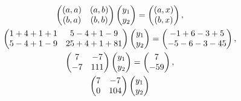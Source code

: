 \documentclass[12pt]{article}
\begin{document}
    \begin{gather*}
        \begin{pmatrix}
            \left ( a, a \right ) & \left ( a, b \right ) \\
            \left ( b, a \right ) & \left ( b, b \right )
        \end{pmatrix}
        \begin{pmatrix}
            y_1 \\
            y_2
        \end{pmatrix}
        =
        \begin{pmatrix}
            \left ( a, x \right ) \\
            \left ( b, x \right )
        \end{pmatrix}, \\
        \begin{pmatrix}
            1 + 4 + 1 + 1 & 5 - 4 + 1 - 9   \\
            5 - 4 + 1 - 9 & 25 + 4 + 1 + 81
        \end{pmatrix}
        \begin{pmatrix}
            y_1 \\
            y_2
        \end{pmatrix}
        =
        \begin{pmatrix}
            -1 + 6 - 3 + 5 \\
            -5 - 6 - 3 - 45
        \end{pmatrix}, \\
        \begin{pmatrix}
            7  & -7  \\
            -7 & 111
        \end{pmatrix}
        \begin{pmatrix}
            y_1 \\
            y_2
        \end{pmatrix}
        =
        \begin{pmatrix}
            7 \\
            -59
        \end{pmatrix}, \\
        \begin{pmatrix}
            7 & -7  \\
            0 & 104
        \end{pmatrix}
        \begin{pmatrix}
            y_1 \\
            y_2

\end{pmatrix}
\end{gather*}
\end{document}
